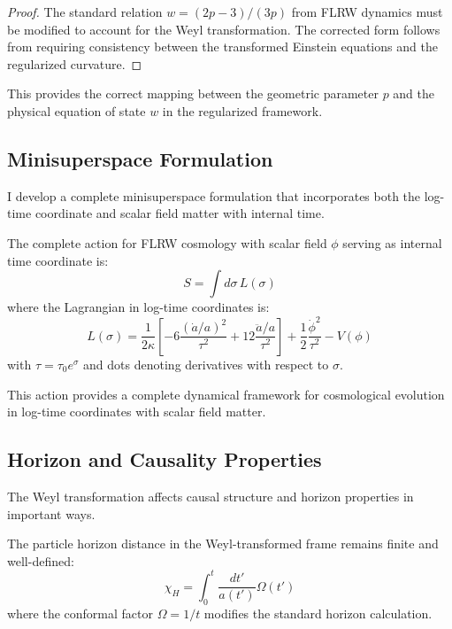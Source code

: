 \begin{proof}
The standard relation $w = (2p-3)/(3p)$ from FLRW dynamics must be modified to account for the Weyl transformation. The corrected form follows from requiring consistency between the transformed Einstein equations and the regularized curvature.
\end{proof}

This provides the correct mapping between the geometric parameter $p$ and the physical equation of state $w$ in the regularized framework.

\subsection{Minisuperspace Formulation}
\label{subsec:minisuperspace}

I develop a complete minisuperspace formulation that incorporates both the log-time coordinate and scalar field matter with internal time.

\begin{theorem}
\label{thm:minisuperspace_action}
The complete action for FLRW cosmology with scalar field $\phi$ serving as internal time coordinate is:
\begin{equation}
S = \int d\sigma \, L(\sigma)
\end{equation}
where the Lagrangian in log-time coordinates is:
\begin{equation}
L(\sigma) = \frac{1}{2\kappa} \left[ -6 \frac{(\dot{a}/a)^2}{\tau^2} + 12 \frac{\ddot{a}/a}{\tau^2} \right] + \frac{1}{2} \frac{\dot{\phi}^2}{\tau^2} - V(\phi)
\end{equation}
with $\tau = \tau_0 e^\sigma$ and dots denoting derivatives with respect to $\sigma$.
\end{theorem}

This action provides a complete dynamical framework for cosmological evolution in log-time coordinates with scalar field matter.

\subsection{Horizon and Causality Properties}
\label{subsec:horizon_causality}

The Weyl transformation affects causal structure and horizon properties in important ways.

\begin{theorem}
\label{thm:particle_horizon_weyl}
The particle horizon distance in the Weyl-transformed frame remains finite and well-defined:
\begin{equation}
\chi_H = \int_0^t \frac{dt'}{a(t')} \Omega(t')
\end{equation}
where the conformal factor $\Omega = 1/t$ modifies the standard horizon calculation.
\end{theorem}

